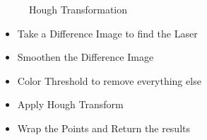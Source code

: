 \begin{figure}[ht!]
\centering
{} \quad
{} \hfill
\caption{Hough Transformation}
\end{figure}




\begin{itemize}
	\item Take a Difference Image to find the Laser
  \item Smoothen the Difference Image
  \item Color Threshold to remove everything else
  \item Apply Hough Transform
  \item Wrap the Points and Return the results
\end{itemize}